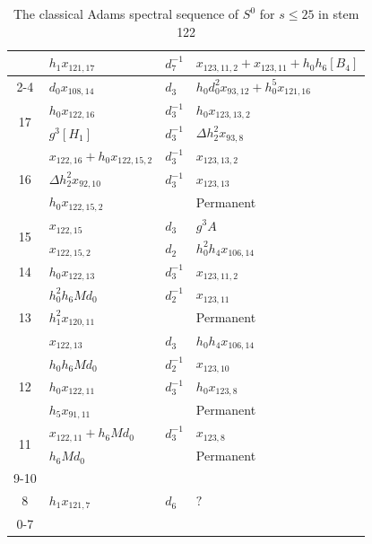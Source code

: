 \documentclass{amsart}
\numberwithin{equation}{section}
\begin{document}
\begin{table}
{\begin{tabular}{|c|l|l|l|}
     & $h_1x_{121,17}$ & $d_{7}^{-1}$ & $x_{123,11,2}+x_{123,11}+h_0h_6[B_4]$ \\\cline{2-4}
     & $d_0x_{108,14}$ & $d_{3}$ & $h_0d_0^2x_{93,12}+h_0^5x_{121,16}$ \\\hline\hline
    \multirow{2}{*}{17} & $h_0x_{122,16}$ & $d_{3}^{-1}$ & $h_0x_{123,13,2}$ \\\cline{2-4}
     & $g^3[H_1]$ & $d_{3}^{-1}$ & $\Delta h_2^2x_{93,8}$ \\\hline\hline
    \multirow{3}{*}{16} & $x_{122,16}+h_0x_{122,15,2}$ & $d_{3}^{-1}$ & $x_{123,13,2}$ \\\cline{2-4}
     & $\Delta h_2^2x_{92,10}$ & $d_{3}^{-1}$ & $x_{123,13}$ \\\cline{2-4}
     & $h_0x_{122,15,2}$ & & Permanent \\\hline\hline
    \multirow{2}{*}{15} & $x_{122,15}$ & $d_{3}$ & $g^3A$ \\\cline{2-4}
     & $x_{122,15,2}$ & $d_{2}$ & $h_0^2h_4x_{106,14}$ \\\hline\hline
    \multirow{1}{*}{14} & $h_0x_{122,13}$ & $d_{3}^{-1}$ & $x_{123,11,2}$ \\\hline\hline
    \multirow{3}{*}{13} & $h_0^2h_6Md_0$ & $d_{2}^{-1}$ & $x_{123,11}$ \\\cline{2-4}
     & $h_1^2x_{120,11}$ & & Permanent \\\cline{2-4}
     & $x_{122,13}$ & $d_{3}$ & $h_0h_4x_{106,14}$ \\\hline\hline
    \multirow{3}{*}{12} & $h_0h_6Md_0$ & $d_{2}^{-1}$ & $x_{123,10}$ \\\cline{2-4}
     & $h_0x_{122,11}$ & $d_{3}^{-1}$ & $h_0x_{123,8}$ \\\cline{2-4}
     & $h_5x_{91,11}$ & & Permanent \\\hline\hline
    \multirow{2}{*}{11} & $x_{122,11}+h_6Md_0$ & $d_{3}^{-1}$ & $x_{123,8}$ \\\cline{2-4}
     & $h_6Md_0$ & & Permanent \\\hline\hline
    \multirow{1}{*}{9-10} & \multicolumn{3}{c|}{}\\\hline\hline
    \multirow{1}{*}{8} & $h_1x_{121,7}$ & $d_{6}$ & $?$ \\\hline\hline
    \multirow{1}{*}{0-7} & \multicolumn{3}{c|}{}\\\hline
\end{tabular}}
\caption{The classical Adams spectral sequence of $S^0$ for $s \le 25$ in stem 122}\vspace{1cm}
\label{Table:S122}
\end{table}
\end{document}
